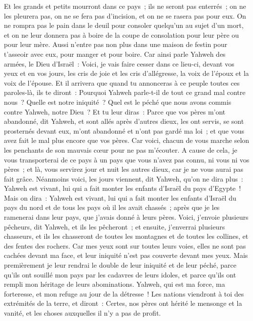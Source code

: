 \begin{multicols}{2}
Et les grands et petits mourront dans ce pays~; ils ne seront pas enterrés~; on ne les pleurera pas, on ne se fera pas d'incision, et on ne se rasera pas pour eux.
On ne rompra pas le pain dans le deuil pour consoler quelqu'un au sujet d'un mort, et on ne leur donnera pas à boire de la coupe de consolation pour leur père ou pour leur mère.
Aussi n'entre pas non plus dans une maison de festin pour t'asseoir avec eux, pour manger et pour boire.
Car ainsi parle Yahweh des armées, le Dieu d'Israël~: Voici, je vais faire cesser dans ce lieu-ci, devant vos yeux et en vos jours, les cris de joie et les cris d'allégresse, la voix de l'époux et la voix de l'épouse.
Et il arrivera que quand tu annonceras à ce peuple toutes ces paroles-là, ils te diront~: Pourquoi Yahweh parle-t-il de tout ce grand mal contre nous~? Quelle est notre iniquité~? Quel est le péché que nous avons commis contre Yahweh, notre Dieu~?
Et tu leur diras~: Parce que vos pères m'ont abandonné, dit Yahweh, et sont allés après d'autres dieux, les ont servis, se sont prosternés devant eux, m'ont abandonné et n'ont pas gardé ma loi~; 
et que vous avez fait le mal plus encore que vos pères. Car voici, chacun de vous marche selon les penchants de son mauvais cœur pour ne pas m'écouter.
A cause de cela, je vous transporterai de ce pays à un pays que vous n'avez pas connu, ni vous ni vos pères~; et là, vous servirez jour et nuit les autres dieux, car je ne vous aurai pas fait grâce.
Néanmoins voici, les jours viennent, dit Yahweh, qu'on ne dira plus~: Yahweh est vivant, lui qui a fait monter les enfants d'Israël du pays d'Egypte~!
Mais on dira~: Yahweh est vivant, lui qui a fait monter les enfants d'Israël du pays du nord et de tous les pays où il les avait chassés~; après que je les ramenerai dans leur pays, que j'avais donné à leurs pères.
Voici, j'envoie plusieurs pêcheurs, dit Yahweh, et ils les pêcheront~; et ensuite, j'enverrai plusieurs chasseurs, et ils les chasseront de toutes les montagnes et de toutes les collines, et des fentes des rochers.
Car mes yeux sont sur toutes leurs voies, elles ne sont pas cachées devant ma face, et leur iniquité n'est pas couverte devant mes yeux.
Mais premièrement je leur rendrai le double de leur iniquité et de leur péché, parce qu'ils ont souillé mon pays par les cadavres de leurs idoles, et parce qu'ils ont rempli mon héritage de leurs abominations.
Yahweh, qui est ma force, ma forteresse, et mon refuge au jour de la détresse~! Les nations viendront à toi des extrémités de la terre, et diront~: Certes, nos pères ont hérité le mensonge et la vanité, et les choses auxquelles il n'y a pas de profit.

\end{multicols}
